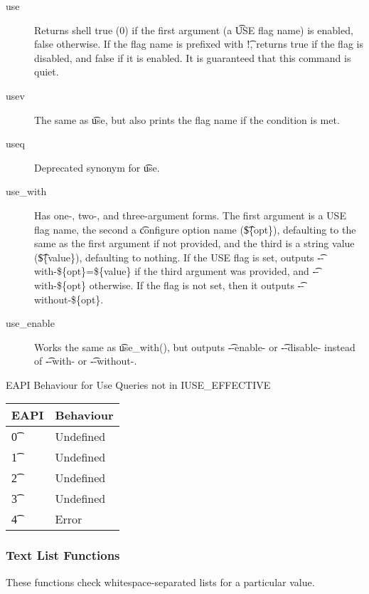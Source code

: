 \begin{description}
\item[use] Returns shell true (0) if the first argument (a \t{USE} flag name) is enabled, false
    otherwise.  If the flag name is prefixed with \t{!}, returns true if the flag is disabled, and
    false if it is enabled. It is guaranteed that this command is quiet.
\item[usev] The same as \t{use}, but also prints the flag name if the condition
    is met.
\item[useq] Deprecated synonym for \t{use}.
\item[use\_with] Has one-, two-, and three-argument forms. The first argument is a USE flag name,
    the second a \t{configure} option name (\t{\$\{opt\}}), defaulting to the same as the first argument
    if not provided, and the third is a string value (\t{\$\{value\}}), defaulting to nothing. If the
    USE flag is set, outputs \t{-{}-with-\$\{opt\}=\$\{value\}} if the third argument was provided, and
    \t{-{}-with-\$\{opt\}} otherwise. If the flag is not set, then it outputs \t{-{}-without-\$\{opt\}}.
\item[use\_enable] Works the same as \t{use\_with()}, but outputs \t{-{}-enable-} or \t{-{}-disable-}
instead of \t{-{}-with-} or \t{-{}-without-}.
\end{description}

\begin{centertable}{EAPI Behaviour for Use Queries not in IUSE\_EFFECTIVE} \label{tab:use-list-strictness}
    \begin{tabular}{ l l }
        \toprule
            \multicolumn{1}{c}{\textbf{EAPI}} &
            \multicolumn{1}{c}{\textbf{Behaviour}} \\
            \midrule
    \t{0} & Undefined \\
    \t{1} & Undefined  \\
    \t{2} & Undefined \\
    \t{3} & Undefined \\
    \t{4} & Error \\
    \bottomrule
    \end{tabular}
\end{centertable}

\subsubsection{Text List Functions}
These functions check whitespace-separated lists for a particular value.

